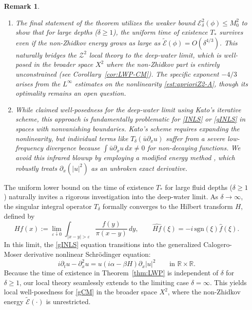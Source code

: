 \documentclass{amsart}
\newtheorem{remark}{Remark}[section]
\numberwithin{equation}{section}
\begin{document}
\begin{remark}\hfill
\begin{enumerate}
\item[{\upshape (1)}] 
The final statement of the theorem utilizes the weaker bound $\mathcal{E}^2_\delta(\phi) \leq M_0^2$ to show that for large depths ($\delta \geq 1$), the uniform time of existence $T_*$ survives even if the non-Zhidkov energy grows as large as $\widetilde{\mathcal{E}}(\phi) = O(\delta^{4/3})$. 
This naturally bridges the $\mathcal{Z}^2$ local theory to the deep-water limit, which is well-posed in the broader space $X^2$ where the non-Zhidkov part is entirely unconstrained (see Corollary~\ref{cor:LWP-CM}). 
The specific exponent $-4/3$ arises from the $L^\infty$ estimates on the nonlinearity \eqref{est:aprioriZ2-A}, though its optimality remains an open question.
\item[{\upshape (2)}] 
While \cite{Chen} claimed well-posedness for the deep-water limit using Kato's iterative scheme, this approach is fundamentally problematic for \eqref{INLS} or \eqref{gINLS} in spaces with nonvanishing boundaries. 
Kato's scheme requires expanding the nonlinearity, but individual terms like $T_\delta(\bar{u}\partial_x u)$ suffer from a severe low-frequency divergence because $\int \bar{u}\partial_x u \,dx \neq 0$ for non-decaying functions. 
We avoid this infrared blowup by employing a modified energy method \cite{shatah,colliander-kdv}, which robustly treats $\partial_x(|u|^2)$ as an unbroken exact derivative.
\end{enumerate}
\end{remark}

The uniform lower bound on the time of existence $T_*$ for large fluid depths ($\delta \geq 1$) naturally invites a rigorous investigation into the deep-water limit. 
As $\delta \to \infty$, the singular integral operator $T_\delta$ formally converges to the Hilbert transform $H$, defined by
\[ H f(x) := \lim_{\varepsilon \downarrow 0} \int_{|x-y|>\varepsilon} \frac{f(y)}{\pi (x-y)}\,dy ,\qquad \widehat{H f}(\xi)=-i\,\mathrm{sgn}(\xi) \hat{f}(\xi). \]
In this limit, the \eqref{gINLS} equation transitions into the generalized Calogero-Moser derivative nonlinear Schr\"odinger equation:
\begin{equation}\label{gCM}\tag{gCM}
i\partial_tu-\partial_x^2u=u(i\alpha -\beta H)\partial_x|u|^2\qquad \text{in $\mathbb{R}\times \mathbb{R}$}.
\end{equation}
Because the time of existence in Theorem~\ref{thm:LWP} is independent of $\delta$ for $\delta \ge 1$, our local theory seamlessly extends to the limiting case $\delta=\infty$. 
This yields local well-posedness for \eqref{gCM} in the broader space $X^2$, where the non-Zhidkov energy $\widetilde{\mathcal{E}}(\cdot)$ is unrestricted.
\end{document}
